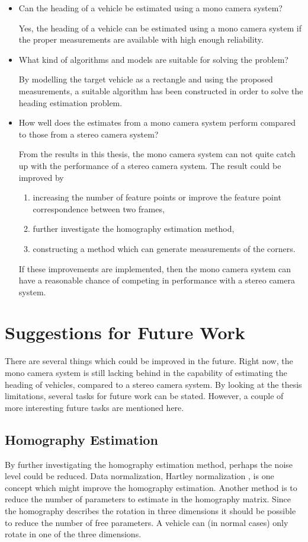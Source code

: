\begin{itemize}
    \item Can the heading of a vehicle be estimated using a mono camera system?

    Yes, the heading of a vehicle can be estimated using a mono camera system if the proper measurements are available with high enough reliability.

    \item What kind of algorithms and models are suitable for solving the problem?

    By modelling the target vehicle as a rectangle and using the proposed measurements, a suitable algorithm has been constructed in order to solve the heading estimation problem.

    \item How well does the estimates from a mono camera system perform compared to those from a stereo camera system?

    From the results in this thesis, the mono camera system can not quite catch up with the performance of a stereo camera system.
    The result could be improved by
	\begin{enumerate}[label=\roman*)]
		\item increasing the number of feature points or improve the feature point correspondence between two frames,
		\item further investigate the homography estimation method,
		\item constructing a method which can generate measurements of the corners.
	\end{enumerate}
	If these improvements are implemented, then the mono camera system can have a reasonable chance of competing in performance with a stereo camera system.
\end{itemize}

\section{Suggestions for Future Work}
There are several things which could be improved in the future.
Right now, the mono camera system is still lacking behind in the capability of estimating the heading of vehicles, compared to a stereo camera system.
By looking at the thesis limitations, several tasks for future work can be stated.
However, a couple of more interesting future tasks are mentioned here.

\subsection{Homography Estimation}
By further investigating the homography estimation method, perhaps the noise level could be reduced.
Data normalization, \eg Hartley normalization \cite{Nordberg:2015}, is one concept which might improve the homography estimation.
Another method is to reduce the number of parameters to estimate in the homography matrix.
Since the homography describes the rotation in three dimensions it should be possible to reduce the number of free parameters.
A vehicle can (in normal cases) only rotate in one of the three dimensions.

